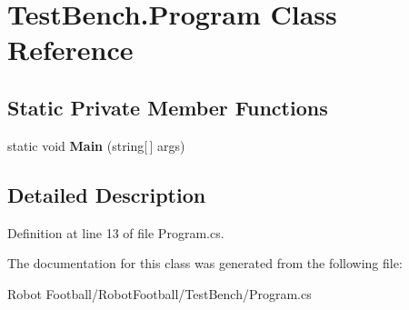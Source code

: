 \hypertarget{class_test_bench_1_1_program}{\section{Test\-Bench.\-Program Class Reference}
\label{class_test_bench_1_1_program}
}
\subsection*{Static Private Member Functions}
\begin{DoxyCompactItemize}
\item 
\hypertarget{class_test_bench_1_1_program_ab495cdcbc46ab5deb1188767c8a2dd92}{static void {\bfseries Main} (string\mbox{[}$\,$\mbox{]} args)}\label{class_test_bench_1_1_program_ab495cdcbc46ab5deb1188767c8a2dd92}

\end{DoxyCompactItemize}


\subsection{Detailed Description}


Definition at line 13 of file Program.\-cs.



The documentation for this class was generated from the following file\-:\begin{DoxyCompactItemize}
\item 
Robot Football/\-Robot\-Football/\-Test\-Bench/Program.\-cs\end{DoxyCompactItemize}
